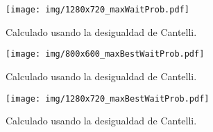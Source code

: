 \begin{figure}[h]

	\texttt{[image: img/1280x720\_maxWaitProb.pdf]}
	\caption{Calculado usando la desigualdad de Cantelli.}

\end{figure}

\begin{figure}[h]

	\texttt{[image: img/800x600\_maxBestWaitProb.pdf]}
	\caption{Calculado usando la desigualdad de Cantelli.}

\end{figure}

\begin{figure}[h]

	\texttt{[image: img/1280x720\_maxBestWaitProb.pdf]}
	\caption{Calculado usando la desigualdad de Cantelli.}

\end{figure}
